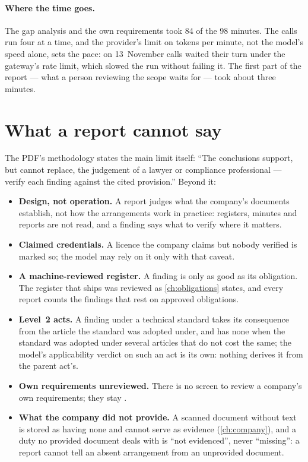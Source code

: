\paragraph{Where the time goes.} The gap analysis and the own requirements took 84 of the 98
minutes. The calls run four at a time, and the provider's limit on tokens per minute, not the
model's speed alone, sets the pace: on 13~November calls waited their turn under the
gateway's rate limit, which slowed the run without failing it. The first part of the report --- what
a person reviewing the scope waits for --- took about three minutes.


\section{What a report cannot say}\label{sec:report:limits}

The PDF's methodology states the main limit itself: \enquote{The conclusions support, but cannot
replace, the judgement of a lawyer or compliance professional --- verify each finding against
the cited provision.} Beyond it:

\begin{itemize}
  \item \textbf{Design, not operation.} A report judges what the company's documents establish,
    not how the arrangements work in practice: registers, minutes and reports are not read, and
    a finding says what to verify where it matters.
  \item \textbf{Claimed credentials.} A licence the company claims but nobody verified is
    marked so; the model may rely on it only with that caveat.
  \item \textbf{A machine-reviewed register.} A finding is only as good as its obligation. The
    register that ships was reviewed as \cref{ch:obligations} states, and every report counts the
    findings that rest on approved obligations.
  \item \textbf{Level~2 acts.} A finding under a technical standard takes its consequence from
    the article the standard was adopted under, and has none when the standard was adopted
    under several articles that do not cost the same; the model's
    applicability verdict on such an act is its own: nothing derives it from the parent act's.
  \item \textbf{Own requirements unreviewed.} There is no screen to review a company's own
    requirements; they stay .
  \item \textbf{What the company did not provide.} A scanned document without text is stored as
    having none and cannot serve as evidence (\cref{ch:company}), and a duty no provided document deals with is \enquote{not
    evidenced}, never \enquote{missing}: a report cannot tell an absent arrangement from an
    unprovided document.
\end{itemize}
